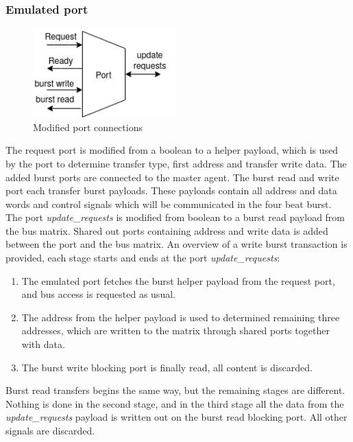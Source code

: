 \subsubsection{Emulated port}
\begin{figure}
\includegraphics[width=5.5cm]{figs/ESL/em_port_burst.png}
\caption{Modified port connections}\label{fig:em-burst}
\end{figure}

The request port is modified from a boolean to a helper payload, which is used by the port to determine transfer type, first address and transfer write data. The added burst ports are connected to the master agent. The burst read and write port each transfer burst payloads. These payloads contain all address and data words and control signals which will be communicated in the four beat burst. The port \textit{update\_requests} is modified from boolean to a burst read payload from the bus matrix. Shared out ports containing address and write data is added between the port and the bus matrix. An overview of a write burst transaction is provided, each stage starts and ends at the port \textit{update\_requests}:

\begin{enumerate}
 \item The emulated port fetches the burst helper payload from the request port, and bus access is requested as usual.
 \item The address from the helper payload is used to determined remaining three addresses, which are written to the matrix through shared ports together with data.
 \item The burst write blocking port is finally read, all content is discarded.  
\end{enumerate}

Burst read transfers begins the same way, but the remaining stages are different. Nothing is done in the second stage, and in the third stage all the data from the \textit{update\_requests} payload is written out on the burst read blocking port. All other signals are discarded. 
  


  
